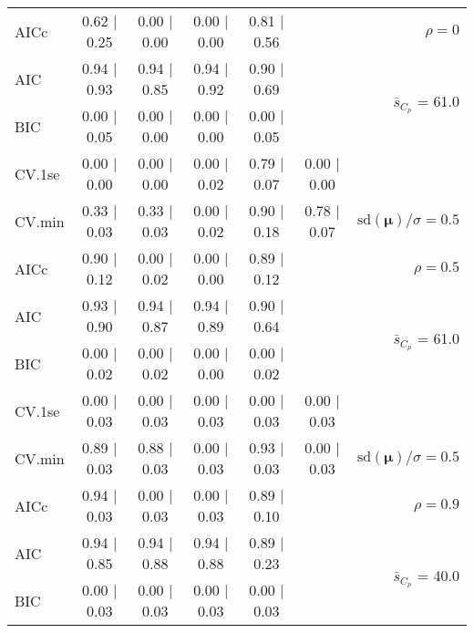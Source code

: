 \documentclass[12pt]{article}
\newcommand{\mr}[1]{\mathrm{#1}}
\newcommand{\bm}[1]{\mathbf{#1}}
\begin{document}
\begin{table}[p]
\begin{center}
\begin{tabular}{l*{5}{c}|r}
AICc & 0.62 $\mid$ 0.25 & 0.00 $\mid$ 0.00 & 0.00 $\mid$ 0.00 & 0.81 $\mid$ 0.56 & & $\rho=0$ \\
AIC & 0.94 $\mid$ 0.93 & 0.94 $\mid$ 0.85 & 0.94 $\mid$ 0.92 & 0.90 $\mid$ 0.69 & & \multirow{2}{*}{$\bar{s}_{C_p}$ = 61.0} \\
BIC & 0.00 $\mid$ 0.05 & 0.00 $\mid$ 0.00 & 0.00 $\mid$ 0.00 & 0.00 $\mid$ 0.05 & & \\
 \hline 
CV.1se & 0.00 $\mid$ 0.00 & 0.00 $\mid$ 0.00 & 0.00 $\mid$ 0.02 & 0.79 $\mid$ 0.07 & 0.00 $\mid$ 0.00 &\\
CV.min & 0.33 $\mid$ 0.03 & 0.33 $\mid$ 0.03 & 0.00 $\mid$ 0.02 & 0.90 $\mid$ 0.18 & 0.78 $\mid$ 0.07 &  $\mr{sd}(\bm{\mu})/\sigma=0.5$ \\
AICc & 0.90 $\mid$ 0.12 & 0.00 $\mid$ 0.02 & 0.00 $\mid$ 0.00 & 0.89 $\mid$ 0.12 & & $\rho=0.5$ \\
AIC & 0.93 $\mid$ 0.90 & 0.94 $\mid$ 0.87 & 0.94 $\mid$ 0.89 & 0.90 $\mid$ 0.64 & & \multirow{2}{*}{$\bar{s}_{C_p}$ = 61.0} \\
BIC & 0.00 $\mid$ 0.02 & 0.00 $\mid$ 0.02 & 0.00 $\mid$ 0.00 & 0.00 $\mid$ 0.02 & & \\
 \hline 
CV.1se & 0.00 $\mid$ 0.03 & 0.00 $\mid$ 0.03 & 0.00 $\mid$ 0.03 & 0.00 $\mid$ 0.03 & 0.00 $\mid$ 0.03 &\\
CV.min & 0.89 $\mid$ 0.03 & 0.88 $\mid$ 0.03 & 0.00 $\mid$ 0.03 & 0.93 $\mid$ 0.03 & 0.00 $\mid$ 0.03 &  $\mr{sd}(\bm{\mu})/\sigma=0.5$ \\
AICc & 0.94 $\mid$ 0.03 & 0.00 $\mid$ 0.03 & 0.00 $\mid$ 0.03 & 0.89 $\mid$ 0.10 & & $\rho=0.9$ \\
AIC & 0.94 $\mid$ 0.85 & 0.94 $\mid$ 0.88 & 0.94 $\mid$ 0.88 & 0.89 $\mid$ 0.23 & & \multirow{2}{*}{$\bar{s}_{C_p}$ = 40.0} \\
BIC & 0.00 $\mid$ 0.03 & 0.00 $\mid$ 0.03 & 0.00 $\mid$ 0.03 & 0.00 $\mid$ 0.03 & & \\
 \hline 
 \end{tabular}
\end{center}
\vspace{-1cm}
\end{table}
\end{document}
